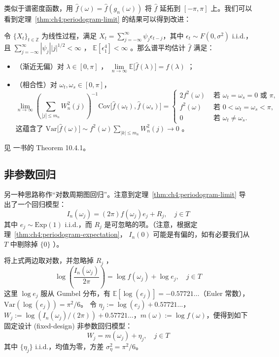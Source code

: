 类似于谱密度函数，用 $\widehat{f}(\omega)=\widehat f(g_n(\omega))$ 将 $\widehat f$ 延拓到 $[-\pi,\pi]$ 上。我们可以看到定理~\ref{thm:ch4:periodogram-limit} 的结果可以得到改进：

\begin{theorem}[离散谱平均估计的相合性]\label{thm:ch4:spectral-average-consistency}

令 $\{X_{t}\}_{t\in\mathbb Z}$ 为线性过程，满足 $X_{t} = \sum_{j = -\infty}^{\infty} \psi_j \epsilon_{t - j}$，其中 $\epsilon_{t}\sim F(0, \sigma^{2})$ i.i.d.，且 $\sum_{j = -\infty}^{\infty} |\psi_{j}| |j|^{1/2} < \infty$ ， $\mathbb{E}[\epsilon_1^4]<\infty$ 。那么谱平均估计 $\widehat f$ 满足：

\begin{itemize}
\tightlist
\item
  （渐近无偏）对 $\lambda\in[0,\pi]$ ， $\lim\limits_{n\to\infty}\mathbb{E}\big[\widehat f(\lambda)\big]=f(\lambda)$ ；
\item
  （相合性）对 $\omega_t,\omega_s\in[0,\pi]$，
  \[  \lim_{n \to \infty} \left( \sum_{|j| \leq m_n} W_n^2(j) \right)^{-1} \mathrm{Cov}\big[\widehat{f}(\omega_t), \widehat{f}(\omega_s)\big] = \begin{cases} 2f^2(\omega) & \text{ 若 } \omega_t = \omega_s = 0 \text{ 或 } \pi, \\ f^2(\omega) & \text{ 若 } 0 < \omega_t = \omega_s < \pi, \\ 0 & \text{ 若 } \omega_t \neq \omega_s. \end{cases}
  \]  这蕴含了 $\mathrm{Var}\big[\widehat f(\omega)\big]\sim f^2(\omega)\sum\limits_{|k|\le m_n}W_n^2(j)\to 0$ 。
\end{itemize}

\end{theorem}


见 \cite{brockwelldavis2006} 一书的 Theorem 10.4.1。

\subsection{非参数回归}

另一种思路称作``对数周期图回归''。注意到定理~\ref{thm:ch4:periodogram-limit} 导出了一个回归模型：
\[I_n(\omega_{j}) = (2\pi)f (\omega_{j})e_{j} + R_j,\quad j\in T\]
其中 $e_j\sim\mathrm{Exp}(1)$ i.i.d.，而 $R_j$ 是可忽略的项。（注意，根据定理~\ref{thm:ch4:periodogram-expectation}， $I_{n}(0)$ 可能是有偏的，如有必要我们从 $T$ 中剔除掉 $\{0\}$ ）。

将上式两边取对数，并忽略掉 $R_j$ ，
\[\log\left(\frac{I_{n}(\omega_j)}{2\pi}\right) = \log f (\omega_j) + \log e_j,\quad j\in T\]
这里 $\log e_j$ 服从 Gumbel 分布，有 $\mathbb{E}[\log(e_j)] = -0.57721\ldots$（Euler 常数），$\mathrm{Var}(\log(e_j)) = \pi^2 /6$。 令 $\eta_j := \log(e_j) + 0.57721\dots$，$W_j := \log(I_n(\omega_j) / (2\pi)) + 0.57721\ldots$，$m(\omega) := \log f(\omega)$，便得到如下固定设计 (fixed-design) 非参数回归模型：
\[W_{j} = m(\omega_{j}) + \eta_{j}, \quad j \in T\]
其中 $\{\eta_{j}\}$ i.i.d.，均值为零，方差 $\sigma_{\eta}^{2} = \pi^{2} / 6$。

